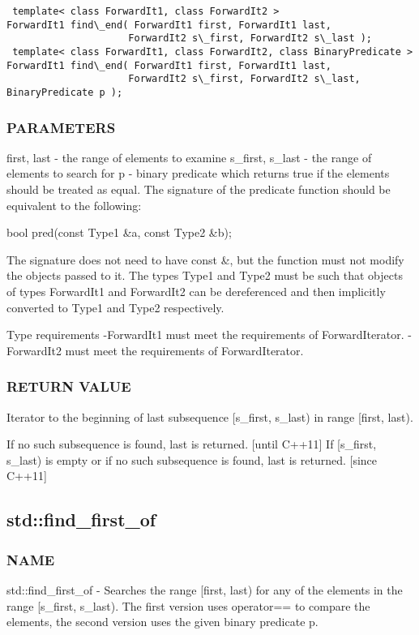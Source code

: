 \begin{lstlisting}
 template< class ForwardIt1, class ForwardIt2 >
ForwardIt1 find\_end( ForwardIt1 first, ForwardIt1 last,
                     ForwardIt2 s\_first, ForwardIt2 s\_last );
 template< class ForwardIt1, class ForwardIt2, class BinaryPredicate >
ForwardIt1 find\_end( ForwardIt1 first, ForwardIt1 last,
                     ForwardIt2 s\_first, ForwardIt2 s\_last, BinaryPredicate p );
\end{lstlisting}

\subsubsection{PARAMETERS}
first, last - the range of elements to examine
s\_first, s\_last - the range of elements to search for
p - binary predicate which returns true  if the elements should be treated as equal.
The signature of the predicate function should be equivalent to the following:

 bool pred(const Type1 \&a, const Type2 \&b);

The signature does not need to have const \&, but the function must not modify the objects passed to it.
The types Type1 and Type2 must be such that objects of types ForwardIt1 and ForwardIt2 can be dereferenced and then implicitly converted to Type1 and Type2 respectively.


 Type requirements
 -ForwardIt1 must meet the requirements of ForwardIterator.
 -ForwardIt2 must meet the requirements of ForwardIterator.

\subsubsection{RETURN VALUE}
Iterator to the beginning of last subsequence [s\_first, s\_last) in range [first, last).

If no such subsequence is found, last is returned.
 [until C++11]
If [s\_first, s\_last) is empty or if no such subsequence is found, last is returned.
 [since C++11]


\subsection{std::find\_first\_of}

\subsubsection{NAME}
std::find\_first\_of - Searches the range [first, last) for any of the elements in the range [s\_first, s\_last). The first version uses operator== to compare the elements, the second version uses the given binary predicate p.

